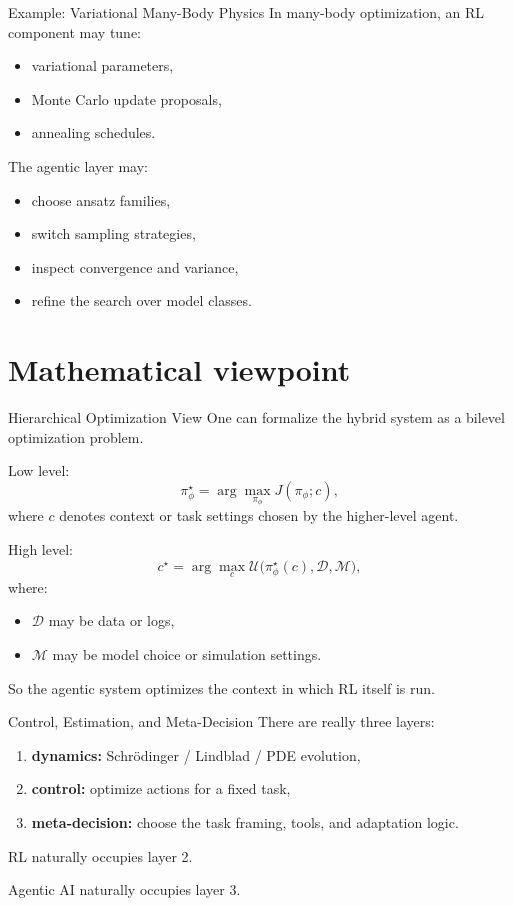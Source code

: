 \documentclass[aspectratio=169]{beamer}
\begin{document}
\begin{frame}{Example: Variational Many-Body Physics}
In many-body optimization, an RL component may tune:
\begin{itemize}
    \item variational parameters,
    \item Monte Carlo update proposals,
    \item annealing schedules.
\end{itemize}

The agentic layer may:
\begin{itemize}
    \item choose ansatz families,
    \item switch sampling strategies,
    \item inspect convergence and variance,
    \item refine the search over model classes.
\end{itemize}
\end{frame}

\section{Mathematical viewpoint}

\begin{frame}{Hierarchical Optimization View}
One can formalize the hybrid system as a bilevel optimization problem.

Low level:
\[
\pi_\phi^\star = \arg\max_{\pi_\phi} J(\pi_\phi; c),
\]
where \(c\) denotes context or task settings chosen by the higher-level agent.

High level:
\[
c^\star = \arg\max_c \mathcal{U}\big(\pi_\phi^\star(c), \mathcal{D}, \mathcal{M}\big),
\]
where:
\begin{itemize}
    \item \(\mathcal{D}\) may be data or logs,
    \item \(\mathcal{M}\) may be model choice or simulation settings.
\end{itemize}

So the agentic system optimizes the context in which RL itself is run.
\end{frame}

\begin{frame}{Control, Estimation, and Meta-Decision}
There are really three layers:
\begin{enumerate}
    \item \textbf{dynamics:} Schr\"odinger / Lindblad / PDE evolution,
    \item \textbf{control:} optimize actions for a fixed task,
    \item \textbf{meta-decision:} choose the task framing, tools, and adaptation logic.
\end{enumerate}

RL naturally occupies layer 2.

Agentic AI naturally occupies layer 3.
\end{frame}
\end{document}
